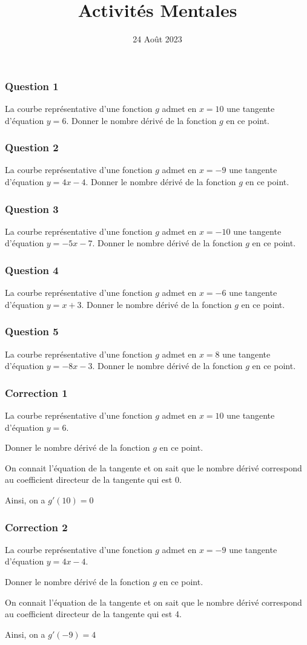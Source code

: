\documentclass[15pt, mathserif]{beamer}
\title{Activités Mentales}
\date{24 Août 2023}
\begin{document}
\begin{frame}
    \titlepage
\end{frame}

\begin{frame} 
	\frametitle{Question 1}
La courbe représentative d'une fonction $g$ admet en $x=10$ une tangente d'équation $y=6$. Donner le nombre dérivé de la fonction $g$ en ce point.\end{frame}


\begin{frame} 
	\frametitle{Question 2}
La courbe représentative d'une fonction $g$ admet en $x=-9$ une tangente d'équation $y=4x-4$. Donner le nombre dérivé de la fonction $g$ en ce point.\end{frame}


\begin{frame} 
	\frametitle{Question 3}
La courbe représentative d'une fonction $g$ admet en $x=-10$ une tangente d'équation $y=-5x-7$. Donner le nombre dérivé de la fonction $g$ en ce point.\end{frame}


\begin{frame} 
	\frametitle{Question 4}
La courbe représentative d'une fonction $g$ admet en $x=-6$ une tangente d'équation $y=x+3$. Donner le nombre dérivé de la fonction $g$ en ce point.\end{frame}


\begin{frame} 
	\frametitle{Question 5}
La courbe représentative d'une fonction $g$ admet en $x=8$ une tangente d'équation $y=-8x-3$. Donner le nombre dérivé de la fonction $g$ en ce point.\end{frame}


\begin{frame}
\vspace{-10mm}
	\frametitle{Correction 1}
La courbe représentative d'une fonction $g$ admet en $x=10$ une tangente d'équation $y=6$.
 
  Donner le nombre dérivé de la fonction $g$ en ce point. 
 
 On connait l'équation de la tangente et on sait que le nombre dérivé correspond au coefficient directeur de la tangente qui est 0. 
 
 Ainsi, on a $g'(10)=0$\end{frame}


\begin{frame}
\vspace{-10mm}
	\frametitle{Correction 2}
La courbe représentative d'une fonction $g$ admet en $x=-9$ une tangente d'équation $y=4x-4$.
 
  Donner le nombre dérivé de la fonction $g$ en ce point. 
 
 On connait l'équation de la tangente et on sait que le nombre dérivé correspond au coefficient directeur de la tangente qui est 4. 
 
 Ainsi, on a $g'(-9)=4$\end{frame}
\end{document}
